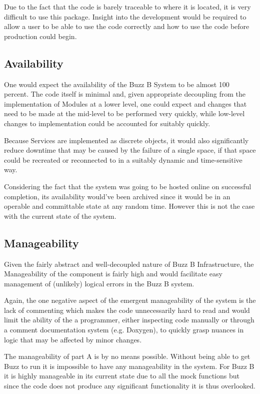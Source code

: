 \documentclass[12pt]{article}
\begin{document}
Due to the fact that the code is barely traceable to where it is located, it is very difficult to use this package. Insight into the development would be required to allow a user to be able to use the code correctly and how to use the code before production could begin.
\subsection{Availability}
One would expect the availability of the Buzz B System to be almost 100 percent. The code itself is minimal and, given appropriate decoupling from the implementation of Modules at a lower level, one could expect and changes that need to be made at the mid-level to be performed very quickly, while low-level changes to implementation could be accounted for suitably quickly.

Because Services are implemented as discrete objects, it would also significantly reduce downtime that may be caused by the failure of a single space, if that space could be recreated or reconnected to in a suitably dynamic and time-sensitive way.

Considering the fact that the system was going to be hosted online on successful completion, its availability would've been archived since it would be in an operable and committable state at any random time. However this is not the case with the current state of the system.

\subsection{Manageability}
Given the fairly abstract and well-decoupled nature of Buzz B Infrastructure, the Manageability of the component is fairly high and would facilitate easy management of (unlikely) logical errors in the Buzz B system. 

Again, the one negative aspect of the emergent manageability of the system is the lack of commenting which makes the code unnecessarily hard to read and would limit the ability of the a programmer, either inspecting code manually or through a comment documentation system (e.g. Doxygen), to quickly grasp nuances in logic that may be affected by minor changes.

The manageability of part A is by no means possible. Without being able to get Buzz to run it is impossible to have any manageability in the system. For Buzz B it is highly manageable in its current state due to all the mock functions but since the code does not produce any significant functionality it is thus overlooked.
\end{document}
